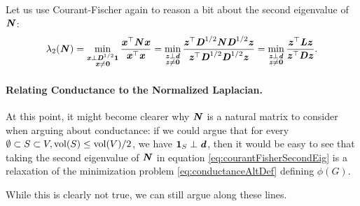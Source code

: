 Let us use Courant-Fischer again to reason a bit about the second eigenvalue of $\NN$:
\begin{align}\label{eq:courantFisherSecondEig}
    \lambda_2(\NN) =
    \min_{
      \substack{ \xx \perp \DD^{1/2}\vecone \\ \xx \neq \veczero}
    }
    \frac{\xx^\trp \NN\xx}{\xx^\trp\xx} = 
    \min_{
      \substack{ \zz \perp \dd \\ \zz \neq \veczero}
    }
    \frac{\zz^\trp \DD^{1/2}  \NN \DD^{1/2} \zz}{\zz^\trp \DD^{1/2}\DD^{1/2}\zz} = \min_{
      \substack{ \zz \perp \dd \\ \zz \neq \veczero}
    } \frac{\zz^\trp \LL \zz}{\zz^\trp \DD \zz}.
\end{align}

\paragraph{Relating Conductance to the Normalized Laplacian.} At this point, it might become clearer why $\NN$ is a natural matrix to consider when arguing about conductance: if we could argue that for every $\emptyset \subset S \subset V, \vol(S) \leq \vol(V)/2$, we have $\vecone_S \perp \dd$, then it would be easy to see that taking the second eigenvalue of $\NN$ in equation \ref{eq:courantFisherSecondEig} is a relaxation of the minimization problem \ref{eq:conductanceAltDef} defining $\phi(G)$.

While this is clearly not true, we can still argue along these lines.

